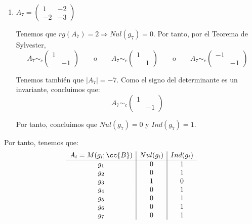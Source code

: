 \begin{ejercicio}
\begin{enumerate}
        \item $A_7=\left(\begin{array}{cc}
            1 & -2 \\
            -2 & -3
        \end{array} \right)$
        
        Tenemos que $rg(A_7) = 2 \Longrightarrow Nul(g_7)=0$. Por tanto, por el Teorema de Sylvester,
        \begin{equation*}
            A_7 \sim_c \left(\begin{array}{cc}
                1 &  \\
                & -1
            \end{array} \right)
            \qquad \text{o} \qquad
            A_7 \sim_c \left(\begin{array}{cc}
                1 &  \\
                & 1
            \end{array} \right)
            \qquad \text{o} \qquad
            A_7 \sim_c \left(\begin{array}{cc}
                -1 &  \\
                & -1
            \end{array} \right)
        \end{equation*}

        Tenemos también que $|A_7| = -7$. Como el signo del determinante es un invariante, concluimos que:
        \begin{equation*}
            A_7 \sim_c \left(\begin{array}{cc}
                1 &  \\
                & -1
            \end{array} \right)
        \end{equation*}
        
        Por tanto, concluimos que $Nul(g_7)=0$ y $Ind(g_7)=1$.
    \end{enumerate}

    Por tanto, tenemos que:
    \begin{equation}
        \begin{array}{c|c|c}
            A_i=M(g_i;\cc{B}) & Nul(g_i) & Ind(g_i)\\ \hline
            g_1 & 0 & 1 \\
            g_2 & 0 & 1 \\
            g_3 & 1 & 0 \\
            g_4 & 0 & 1 \\
            g_5 & 0 & 1 \\
            g_6 & 0 & 1 \\
            g_7 & 0 & 1 \\
        \end{array}
    \end{equation}
\end{ejercicio}

